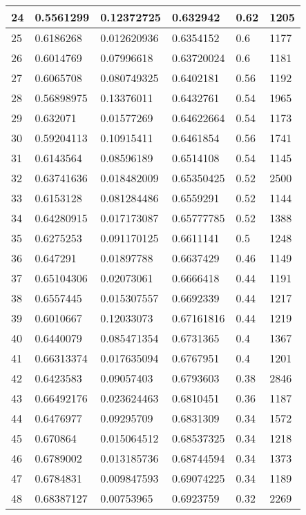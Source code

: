 \begin{longtable}{|l|l|l|l|l|l|}
24 & 0.5561299 & 0.12372725 & 0.632942 & 0.62 & 1205 \\ \hline 
25 & 0.6186268 & 0.012620936 & 0.6354152 & 0.6 & 1177 \\ \hline 
26 & 0.6014769 & 0.07996618 & 0.63720024 & 0.6 & 1181 \\ \hline 
27 & 0.6065708 & 0.080749325 & 0.6402181 & 0.56 & 1192 \\ \hline 
28 & 0.56898975 & 0.13376011 & 0.6432761 & 0.54 & 1965 \\ \hline 
29 & 0.632071 & 0.01577269 & 0.64622664 & 0.54 & 1173 \\ \hline 
30 & 0.59204113 & 0.10915411 & 0.6461854 & 0.56 & 1741 \\ \hline 
31 & 0.6143564 & 0.08596189 & 0.6514108 & 0.54 & 1145 \\ \hline 
32 & 0.63741636 & 0.018482009 & 0.65350425 & 0.52 & 2500 \\ \hline 
33 & 0.6153128 & 0.081284486 & 0.6559291 & 0.52 & 1144 \\ \hline 
34 & 0.64280915 & 0.017173087 & 0.65777785 & 0.52 & 1388 \\ \hline 
35 & 0.6275253 & 0.091170125 & 0.6611141 & 0.5 & 1248 \\ \hline 
36 & 0.647291 & 0.01897788 & 0.6637429 & 0.46 & 1149 \\ \hline 
37 & 0.65104306 & 0.02073061 & 0.6666418 & 0.44 & 1191 \\ \hline 
38 & 0.6557445 & 0.015307557 & 0.6692339 & 0.44 & 1217 \\ \hline 
39 & 0.6010667 & 0.12033073 & 0.67161816 & 0.44 & 1219 \\ \hline 
40 & 0.6440079 & 0.085471354 & 0.6731365 & 0.4 & 1367 \\ \hline 
41 & 0.66313374 & 0.017635094 & 0.6767951 & 0.4 & 1201 \\ \hline 
42 & 0.6423583 & 0.09057403 & 0.6793603 & 0.38 & 2846 \\ \hline 
43 & 0.66492176 & 0.023624463 & 0.6810451 & 0.36 & 1187 \\ \hline 
44 & 0.6476977 & 0.09295709 & 0.6831309 & 0.34 & 1572 \\ \hline 
45 & 0.670864 & 0.015064512 & 0.68537325 & 0.34 & 1218 \\ \hline 
46 & 0.6789002 & 0.013185736 & 0.68744594 & 0.34 & 1373 \\ \hline 
47 & 0.6784831 & 0.009847593 & 0.69074225 & 0.34 & 1189 \\ \hline 
48 & 0.68387127 & 0.00753965 & 0.6923759 & 0.32 & 2269 \\ \hline 

\end{longtable}
